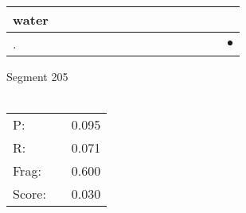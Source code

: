 \documentclass[landscape]{article}
\newcommand{\ssp}{\hspace{2pt}}
\newcommand{\mex}{\cellcolor{g}$\bullet$}
\begin{document}
\begin{tabular}{|l|p{10pt}|p{10pt}|p{10pt}|p{10pt}|p{10pt}|p{10pt}|p{10pt}|p{10pt}|p{10pt}|p{10pt}|p{10pt}|p{10pt}|p{10pt}|p{10pt}|}
\hline
\ssp water \ssp&\hspace{2pt}&\hspace{2pt}&\hspace{2pt}&\hspace{2pt}&\hspace{2pt}&\hspace{2pt}&\hspace{2pt}&\hspace{2pt}&\hspace{2pt}&\hspace{2pt}&\hspace{2pt}&\hspace{2pt}&\hspace{2pt}&\hspace{2pt}\\
\hline
\ssp \cellcolor{ref13}. \ssp&\hspace{2pt}&\hspace{2pt}&\hspace{2pt}&\hspace{2pt}&\hspace{2pt}&\hspace{2pt}&\hspace{2pt}&\hspace{2pt}&\hspace{2pt}&\hspace{2pt}&\hspace{2pt}&\hspace{2pt}&\hspace{2pt}&\hspace{2pt}\mex\\
\hline
\end{tabular}

\vspace{6pt}
\noindent Segment 205\\\\
\noindent\begin{tabular}{lm{12pt}r}
\hline
P:&&0.095\\
R:&&0.071\\
Frag:&&0.600\\
Score:&&0.030\\
\end{tabular}

\newpage
\end{document}
